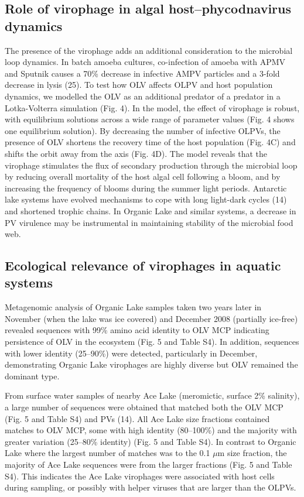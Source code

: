 \subsection[Virophage in algal host--phycodnavirus dynamics]{Role of virophage in algal host--phycodnavirus dynamics}
The presence of the virophage adds an additional consideration to the microbial loop dynamics. 
In batch amoeba cultures, co-infection of amoeba with APMV and Sputnik causes a 70\% decrease in infective AMPV particles and a 3-fold decrease in lysis (25). 
To test how OLV affects OLPV and host population dynamics, we modelled the OLV as an additional predator of a predator in a Lotka-Volterra simulation (Fig. 4). 
In the model, the effect of virophage is robust, with equilibrium solutions across a wide range of parameter values (Fig. 4 shows one equilibrium solution). 
By decreasing the number of infective OLPVs, the presence of OLV shortens the recovery time of the host population (Fig. 4C) and shifts the orbit away from the axis (Fig. 4D). 
The model reveals that the virophage stimulates the flux of secondary production through the microbial loop by reducing overall mortality of the host algal cell following a bloom, and by increasing the frequency of blooms during the summer light periods. 
Antarctic lake systems have evolved mechanisms to cope with long light-dark cycles (14) and shortened trophic chains. 
In Organic Lake and similar systems, a decrease in PV virulence may be instrumental in maintaining stability of the microbial food web. 

\subsection{Ecological relevance of virophages in aquatic systems}
Metagenomic analysis of Organic Lake samples taken two years later in November (when the lake was ice covered) and December 2008 (partially ice-free) revealed sequences with 99\% amino acid identity to OLV MCP indicating persistence of OLV in the ecosystem (Fig. 5 and Table S4). 
In addition, sequences with lower identity (25--90\%) were detected, particularly in December, demonstrating Organic Lake virophages are highly diverse but OLV remained the dominant type. 

From surface water samples of nearby Ace Lake (meromictic, surface 2\% salinity), a large number of sequences were obtained that matched both the OLV MCP (Fig. 5 and Table S4) and PVs (14). 
All Ace Lake size fractions contained matches to OLV MCP, some with high identity (80--100\%) and the majority with greater variation (25--80\% identity) (Fig. 5 and Table S4). 
In contrast to Organic Lake where the largest number of matches was to the 0.1 $\mu$m size fraction, the majority of Ace Lake sequences were from the larger fractions (Fig. 5 and Table S4). 
This indicates the Ace Lake virophages were associated with host cells during sampling, or possibly with helper viruses that are larger than the OLPVs. 

